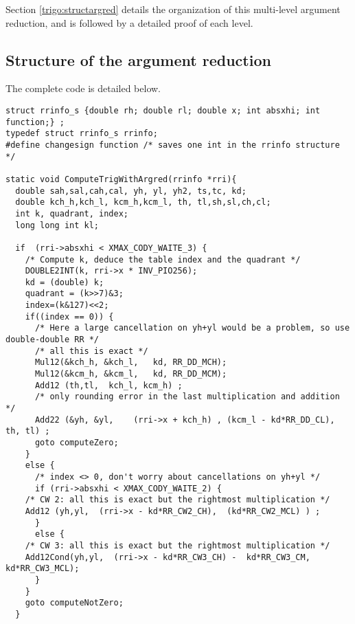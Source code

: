 Section \ref{trigo:structargred} details the organization of this
multi-level argument reduction, and is followed by a detailed proof of
each level.



\subsection{Structure of the argument reduction
  \label{trigo:structargred}}
The complete code is detailed below.

\begin{lstlisting}[caption={Multilevel argument reduction \label{lst:trig:argred}},firstnumber=1]
struct rrinfo_s {double rh; double rl; double x; int absxhi; int function;} ;
typedef struct rrinfo_s rrinfo;
#define changesign function /* saves one int in the rrinfo structure */

static void ComputeTrigWithArgred(rrinfo *rri){ 
  double sah,sal,cah,cal, yh, yl, yh2, ts,tc, kd; 
  double kch_h,kch_l, kcm_h,kcm_l, th, tl,sh,sl,ch,cl;
  int k, quadrant, index;
  long long int kl;

  if  (rri->absxhi < XMAX_CODY_WAITE_3) {
    /* Compute k, deduce the table index and the quadrant */
    DOUBLE2INT(k, rri->x * INV_PIO256);
    kd = (double) k;
    quadrant = (k>>7)&3;      
    index=(k&127)<<2;
    if((index == 0)) { 
      /* Here a large cancellation on yh+yl would be a problem, so use double-double RR */
      /* all this is exact */
      Mul12(&kch_h, &kch_l,   kd, RR_DD_MCH);
      Mul12(&kcm_h, &kcm_l,   kd, RR_DD_MCM);
      Add12 (th,tl,  kch_l, kcm_h) ;
      /* only rounding error in the last multiplication and addition */ 
      Add22 (&yh, &yl,    (rri->x + kch_h) , (kcm_l - kd*RR_DD_CL),   th, tl) ;
      goto computeZero;
    } 
    else {      
      /* index <> 0, don't worry about cancellations on yh+yl */
      if (rri->absxhi < XMAX_CODY_WAITE_2) {
	/* CW 2: all this is exact but the rightmost multiplication */
	Add12 (yh,yl,  (rri->x - kd*RR_CW2_CH),  (kd*RR_CW2_MCL) ) ; 
      }
      else { 
	/* CW 3: all this is exact but the rightmost multiplication */
	Add12Cond(yh,yl,  (rri->x - kd*RR_CW3_CH) -  kd*RR_CW3_CM,   kd*RR_CW3_MCL);
      }
    }
    goto computeNotZero;
  }


\end{lstlisting}
